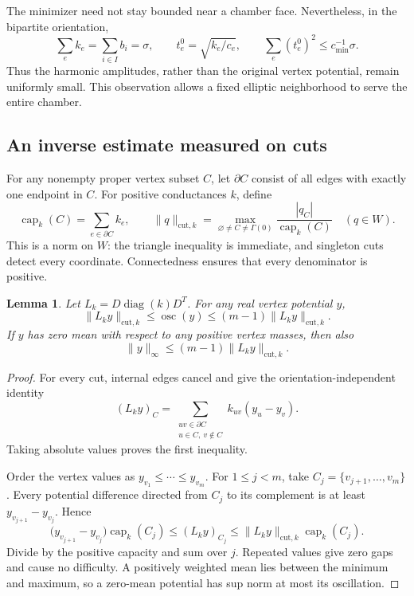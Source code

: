 \documentclass[11pt]{amsart}
\newtheorem{lemma}[theorem]{Lemma}
\theoremstyle{definition}
\theoremstyle{remark}
\newcommand{\diag}{\operatorname{diag}}
\newcommand{\osc}{\operatorname{osc}}
\newcommand{\capk}{\operatorname{cap}}
\begin{document}
The minimizer need not stay bounded near a chamber face.
Nevertheless, in the bipartite orientation,
\begin{equation}\label{eq02:smallamplitudes}
 \sum_e k_e=\sum_{i\in I}b_i=\sigma,\qquad
 t_e^0=\sqrt{k_e/c_e},\qquad
 \sum_e(t_e^0)^2\leq c_{\min}^{-1}\sigma.
\end{equation}
Thus the harmonic amplitudes, rather than the original vertex
potential, remain uniformly small. This observation allows a
fixed elliptic neighborhood to serve the entire chamber.

\subsection{An inverse estimate measured on cuts}

For any nonempty proper vertex subset \(C\), let
\(\partial C\) consist of all edges with exactly one endpoint in
\(C\). For positive conductances \(k\), define
\[
 \capk_k(C)=\sum_{e\in\partial C}k_e,\qquad
 \|q\|_{\mathrm{cut},k}
 =\max_{\varnothing\ne C\ne\Gamma(0)}
     \frac{|q_C|}{\capk_k(C)}
 \quad(q\in W).
\]
This is a norm on \(W\): the triangle inequality is immediate,
and singleton cuts detect every coordinate. Connectedness
ensures that every denominator is positive.

\begin{lemma}\label{lem02:cutinverse}
Let \(L_k=D\diag(k)D^T\). For any real vertex potential \(y\),
\begin{equation}\label{eq02:cutinverse}
 \|L_ky\|_{\mathrm{cut},k}
 \leq\osc(y)
 \leq(m-1)\|L_ky\|_{\mathrm{cut},k}.
\end{equation}
If \(y\) has zero mean with respect to any positive vertex masses,
then also
\[
 \|y\|_\infty\leq(m-1)\|L_ky\|_{\mathrm{cut},k}.
\]
\end{lemma}

\begin{proof}
For every cut, internal edges cancel and give the
orientation-independent identity
\[
 (L_ky)_C
 =\sum_{\substack{uv\in\partial C\\u\in C,\ v\notin C}}
       k_{uv}(y_u-y_v).
\]
Taking absolute values proves the first inequality.

Order the vertex values as
\(y_{v_1}\leq\cdots\leq y_{v_m}\).
For \(1\leq j<m\), take \(C_j=\{v_{j+1},\ldots,v_m\}\).
Every potential difference directed from \(C_j\) to its complement
is at least \(y_{v_{j+1}}-y_{v_j}\). Hence
\[
 \bigl(y_{v_{j+1}}-y_{v_j}\bigr)\capk_k(C_j)
 \leq (L_ky)_{C_j}
 \leq \|L_ky\|_{\mathrm{cut},k}\capk_k(C_j).
\]
Divide by the positive capacity and sum over \(j\). Repeated
values give zero gaps and cause no difficulty.
A positively weighted mean lies between the minimum and maximum,
so a zero-mean potential has sup norm at most its oscillation.
\end{proof}
\end{document}
